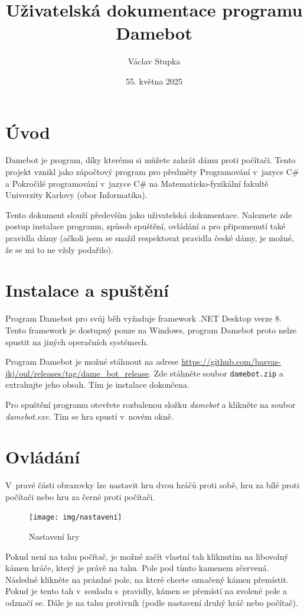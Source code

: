 \documentclass[a4paper,12pt]{article}
\title{Uživatelská dokumentace programu Damebot}
\author{Václav Stupka}
\date{55. května 2025}
\begin{document}
	\maketitle
	\tableofcontents
	
	\section{Úvod}
	Damebot je program, díky kterému si můžete zahrát dámu proti počítači. Tento projekt vznikl jako zápočtový program
	pro předměty Programování v~jazyce C\# a Pokročilé programování v~jazyce C\# na Matematicko-fyzikální fakultě Univerzity
	Karlovy (obor Informatika). 
	
	Tento dokument slouží především jako uživatelská dokumentace. Naleznete zde postup instalace programu, způsob spuštění,
	ovládání a pro při\-po\-me\-nu\-tí také pravidla dámy (ačkoli jsem se snažil respektovat pravidla české dámy, je možné, že se
	mi to ne vždy podařilo).
	
	\section{Instalace a spuštění}
	Program Damebot pro svůj běh vyžaduje framework .NET Desktop verze 8. Tento framework je dostupný pouze na Windows, program Damebot proto nelze spustit na jiných operačních systémech.
	
	Program Damebot je možné stáhnout na adrese
	\url{https://github.com/basvas-jkj/oul/releases/tag/dame_bot_release}.
	Zde stáhněte soubor \texttt{damebot.zip}
	a extrahujte jeho obsah. Tím je instalace dokončena.
	
	Pro spuštění programu otevřete rozbalenou složku \textit{damebot} a klikněte na soubor \textit{damebot.exe}.
	Tím se hra spustí v~novém okně.
	
	\section{Ovládání}
	V~pravé části obrazovky lze nastavit hru dvou hráčů proti sobě, hru za bílé proti počítači nebo hru za černé proti počítači.
	
	
	\begin{figure}[h]
		\centering
		\texttt{[image: img/nastavení]}
		\caption{Nastavení hry}
	\end{figure}
	
	
	Pokud není na tahu počítač, je možné začít vlastní tah kliknutím na libovolný kámen hráče, který je právě na tahu.
	Pole pod tímto kamenem zčervená. Následně klikněte na prázdné pole, na které chcete označený kámen přemístit. Pokud je tento tah v~souladu s~pravidly, kámen se přemístí na zvolené pole a odznačí se. Dále je na tahu protivník (podle nastavení druhý hráč nebo počítač).
	
\end{document}
